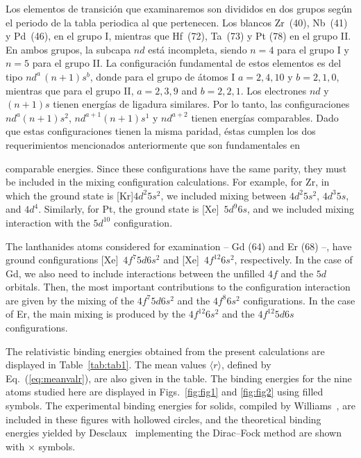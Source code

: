 Los elementos de transición que examinaremos son divididos en dos grupos
según el periodo de la tabla periodica al que pertenecen. Los blancos 
Zr~(40), Nb~(41) y Pd~(46), en el grupo I, mientras que Hf~(72), 
Ta~(73) y Pt (78) en el grupo II. En ambos grupos, la subcapa $nd$ está
incompleta, siendo $n=4$ para el grupo I y $n=5$ para el grupo II.
La configuración fundamental de estos elementos es del tipo 
$nd^a \,(n+1)s^b$, donde para el grupo de átomos I $a=2,4,10$ y
$b=2,1,0$, mientras que para el grupo II, $a=2,3,9$ and $b=2,2,1$.
Los electrones $nd$ y $(n+1)s$ tienen energías de ligadura similares.
Por lo tanto, las configuraciones $nd^a(n+1)s^2$, $nd^{a+1}(n+1)s^1$ y 
$nd^{a+2}$ tienen energías comparables. Dado que estas configuraciones
tienen la misma paridad, éstas cumplen los dos requerimientos mencionados
anteriormente que son fundamentales en 

comparable energies. Since these configurations have the
same parity, they must be included in the mixing configuration
calculations.
For example, for Zr, in which the ground state is [Kr]$4d^2 5s^2$,
we included mixing between $4d^2 5s^2$, $4d^3 5s$, and
$4d^4$.
Similarly, for Pt, the ground state is [Xe]~$5d^9 6s$, and
we included mixing interaction with the $5d^{10}$ configuration.

The lanthanides atoms considered for examination -- Gd (64) and 
Er (68) --, have
ground configurations [Xe]~$4f^7 5d 6s^2$ and [Xe]~$4f^{12} 6s^2$,
respectively. In the case of Gd, we also need to include interactions
between the unfilled $4f$ and the $5d$ orbitals.
Then, the most important contributions to the configuration interaction
are given by the mixing of the
$4f^7 5d 6s^2$ and the $4f^8 6s^2$ configurations.
In the case of Er, the main mixing is produced by the
$4f^{12} 6s^2$ and the $4f^{12} 5d 6s$ configurations.

The relativistic binding energies obtained from the present 
calculations are displayed in Table~\ref{tab:tab1}.
The mean values $\langle r \rangle$, defined by Eq.~(\ref{eq:meanvalr}),
are also given in the table.
The binding energies for the nine atoms studied here are displayed
in Figs.~\ref{fig:fig1} and \ref{fig:fig2} using filled symbols.
The experimental binding energies for solids, compiled by
Williams~\cite{expdata}, are included in these figures with hollowed
circles, and the theoretical binding energies yielded by
Desclaux~\cite{Desclaux:73} implementing the Dirac--Fock method are
shown with $\times$ symbols.

